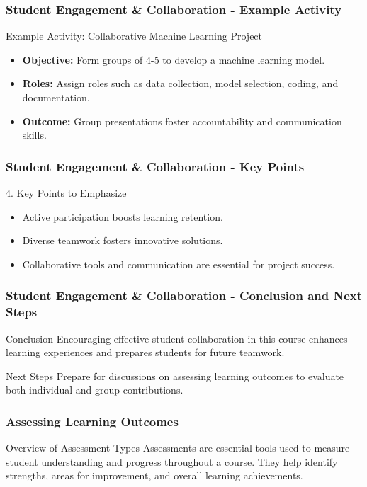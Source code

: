 \documentclass[aspectratio=169]{beamer}
\begin{document}
\begin{frame}[fragile]
    \frametitle{Student Engagement \& Collaboration - Example Activity}
    \begin{block}{Example Activity: Collaborative Machine Learning Project}
        \begin{itemize}
            \item \textbf{Objective:} Form groups of 4-5 to develop a machine learning model.
            \item \textbf{Roles:} Assign roles such as data collection, model selection, coding, and documentation.
            \item \textbf{Outcome:} Group presentations foster accountability and communication skills.
        \end{itemize}
    \end{block}
\end{frame}

\begin{frame}[fragile]
    \frametitle{Student Engagement \& Collaboration - Key Points}
    \begin{block}{4. Key Points to Emphasize}
        \begin{itemize}
            \item Active participation boosts learning retention.
            \item Diverse teamwork fosters innovative solutions.
            \item Collaborative tools and communication are essential for project success.
        \end{itemize}
    \end{block}
\end{frame}

\begin{frame}[fragile]
    \frametitle{Student Engagement \& Collaboration - Conclusion and Next Steps}
    \begin{block}{Conclusion}
        Encouraging effective student collaboration in this course enhances learning experiences and prepares students for future teamwork.
    \end{block}

    \begin{block}{Next Steps}
        Prepare for discussions on assessing learning outcomes to evaluate both individual and group contributions.
    \end{block}
\end{frame}

\begin{frame}[fragile]
    \frametitle{Assessing Learning Outcomes}
    \begin{block}{Overview of Assessment Types}
        Assessments are essential tools used to measure student understanding and progress throughout a course. They help identify strengths, areas for improvement, and overall learning achievements.
    \end{block}
\end{frame}
\end{document}
